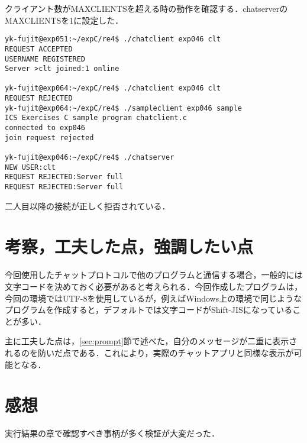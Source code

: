 \documentclass[a4j,10pt,titlepage]{jsarticle}
\begin{document}
クライアント数がMAXCLIENTSを超える時の動作を確認する．chatserverのMAXCLIENTSを1に設定した．
\begin{verbatim}
yk-fujit@exp051:~/expC/re4$ ./chatclient exp046 clt
REQUEST ACCEPTED
USERNAME REGISTERED
Server >clt joined:1 online

yk-fujit@exp064:~/expC/re4$ ./chatclient exp046 clt
REQUEST REJECTED
yk-fujit@exp064:~/expC/re4$ ./sampleclient exp046 sample
ICS Exercises C sample program chatclient.c
connected to exp046
join request rejected

yk-fujit@exp046:~/expC/re4$ ./chatserver 
NEW USER:clt
REQUEST REJECTED:Server full
REQUEST REJECTED:Server full
\end{verbatim}
二人目以降の接続が正しく拒否されている．

\section{考察，工夫した点，強調したい点}
今回使用したチャットプロトコルで他のプログラムと通信する場合，一般的には文字コードを決めておく必要があると考えられる．今回作成したプログラムは，今回の環境ではUTF-8を使用しているが，例えばWindows上の環境で同じようなプログラムを作成すると，デフォルトでは文字コードがShift-JISになっていることが多い．

主に工夫した点は，\ref{sec:prompt}節で述べた，自分のメッセージが二重に表示されるのを防いだ点である．これにより，実際のチャットアプリと同様な表示が可能となる．

\section{感想}
実行結果の章で確認すべき事柄が多く検証が大変だった．
\end{document}
